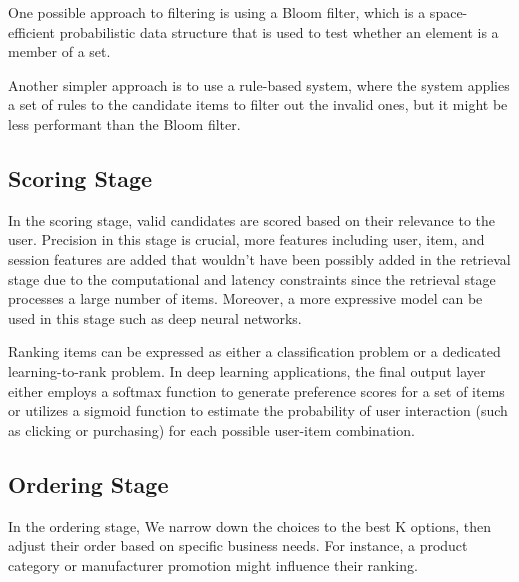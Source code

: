 One possible approach to filtering is using a Bloom filter, which is a space-efficient probabilistic data structure that is used to test whether an element is a member of a set.

Another simpler approach is to use a rule-based system, where the system applies a set of rules to the candidate items to filter out the invalid ones, but it might be less performant than the Bloom filter.


\subsection{Scoring Stage}

In the scoring stage, valid candidates are scored based on their relevance to the user. Precision in this stage is crucial, more features including user, item, and session features are added that wouldn't have been possibly added in the retrieval stage due to the computational and latency constraints since the retrieval stage processes a large number of items. Moreover, a more expressive model can be used in this stage such as deep neural networks. \cite{eugeneyan}

Ranking items can be expressed as either a classification problem or a dedicated learning-to-rank problem. In deep learning applications, the final output layer either employs a softmax function to generate preference scores for a set of items or utilizes a sigmoid function to estimate the probability of user interaction (such as clicking or purchasing) for each possible user-item combination. \cite{eugeneyan}

\subsection{Ordering Stage}
In the ordering stage, We narrow down the choices to the best K options, then adjust their order based on specific business needs. For instance, a product category or manufacturer promotion might influence their ranking. \cite{NvidiaRecSysBestPractices}
